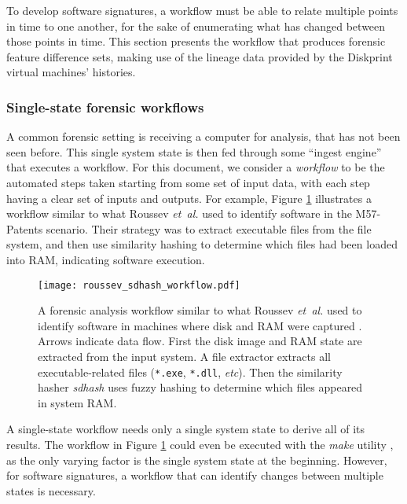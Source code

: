 \documentclass[11pt]{ucthesis}
\theoremstyle{plain}
\theoremstyle{definition}
\newcommand{\etal}{\emph{et~al.}\xspace}
\newcommand{\etc}{\emph{etc}\xspace}
\newcommand{\make}{\emph{make}\xspace}
\newcommand{\sdhash}{\emph{sdhash}\xspace}
\begin{document}
To develop software signatures, a workflow must be able to relate multiple points in time to one another, for the sake of enumerating what has changed between those points in time.  This section presents the workflow that produces forensic feature difference sets, making use of the lineage data provided by the Diskprint virtual machines' histories.


\subsubsection{Single-state forensic workflows}

A common forensic setting is receiving a computer for analysis, that has not been seen before.  This single system state is then fed through some ``ingest engine'' that executes a workflow.  For this document, we consider a \emph{workflow} to be the automated steps taken starting from some set of input data, with each step having a clear set of inputs and outputs.  For example, Figure \ref{fig:sdhashworkflow} illustrates a workflow similar to what Roussev \etal used to identify software in the M57-Patents scenario.  Their strategy was to extract executable files from the file system, and then use similarity hashing to determine which files had been loaded into RAM, indicating software execution.

\begin{figure}
\begin{center}
\texttt{[image: roussev\_sdhash\_workflow.pdf]}
\caption{\label{fig:sdhashworkflow} A forensic analysis workflow similar to what Roussev \etal used to identify software in machines where disk and RAM were captured \cite{roussev:dfrws12}.  Arrows indicate data flow.  First the disk image and RAM state are extracted from the input system.  A file extractor extracts all executable-related files (\texttt{*.exe}, \texttt{*.dll}, \etc).  Then the similarity hasher \sdhash \cite{roussev:ifip10} uses fuzzy hashing to determine which files appeared in system RAM.}
\end{center}
\end{figure}

A single-state workflow needs only a single system state to derive all of its results.  The workflow in Figure \ref{fig:sdhashworkflow} could even be executed with the \make utility \cite{mecklenburg:oreilly04}, as the only varying factor is the single system state at the beginning.  However, for software signatures, a workflow that can identify changes between multiple states is necessary.
\end{document}
